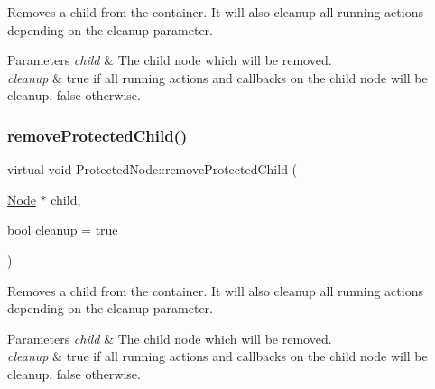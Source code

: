 Removes a child from the container. It will also cleanup all running actions depending on the cleanup parameter.


\begin{DoxyParams}{Parameters}
{\em child} & The child node which will be removed. \\
\hline
{\em cleanup} & true if all running actions and callbacks on the child node will be cleanup, false otherwise. \\
\hline
\end{DoxyParams}
\mbox{\label{classProtectedNode_a6e57c27ae8946caaa1a3ce4626742c4a}} 
\subsubsection{\texorpdfstring{remove\+Protected\+Child()}{removeProtectedChild()}\hspace{0.1cm}{\footnotesize\ttfamily [2/2]}}
{\footnotesize\ttfamily virtual void Protected\+Node\+::remove\+Protected\+Child (\begin{DoxyParamCaption}\item[{\hyperlink{classNode}{Node} $\ast$}]{child,  }\item[{bool}]{cleanup = {\ttfamily true} }\end{DoxyParamCaption})\hspace{0.3cm}{\ttfamily [virtual]}}

Removes a child from the container. It will also cleanup all running actions depending on the cleanup parameter.


\begin{DoxyParams}{Parameters}
{\em child} & The child node which will be removed. \\
\hline
{\em cleanup} & true if all running actions and callbacks on the child node will be cleanup, false otherwise. \\
\hline
\end{DoxyParams}
\mbox{\label{classProtectedNode_a3acbf045580d1acbef9b63e812eb17c0}} 
